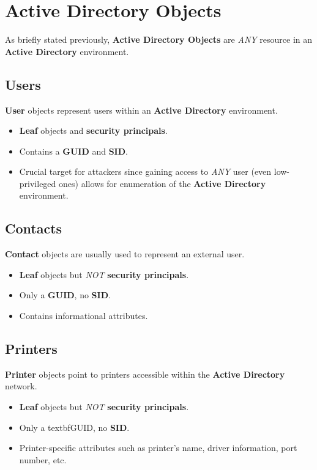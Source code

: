 \documentclass[12pt, letterpaper]{article}
\begin{document}
\section*{Active Directory Objects}

As briefly stated previously, \textbf{Active Directory Objects} are \textit{ANY} resource in an \textbf{Active Directory} environment.

\subsection*{Users}

\textbf{User} objects represent users within an \textbf{Active Directory} environment.

\begin{itemize}
    \item \textbf{Leaf} objects and \textbf{security principals}.
    \item Contains a \textbf{GUID} and \textbf{SID}.
    \item Crucial target for attackers since gaining access to \textit{ANY} user (even low-privileged ones) allows for enumeration of the \textbf{Active Directory} environment.
\end{itemize}

\subsection*{Contacts}

\textbf{Contact} objects are usually used to represent an external user.

\begin{itemize}
    \item \textbf{Leaf} objects but \textit{NOT} \textbf{security principals}.
    \item Only a \textbf{GUID}, no \textbf{SID}.
    \item Contains informational attributes.
\end{itemize}

\subsection*{Printers}

\textbf{Printer} objects point to printers accessible within the \textbf{Active Directory} network.

\begin{itemize}
    \item \textbf{Leaf} objects but \textit{NOT} \textbf{security principals}.
    \item Only a textbf{GUID}, no \textbf{SID}.
    \item Printer-specific attributes such as printer's name, driver information, port number, etc.
\end{itemize}
\end{document}
